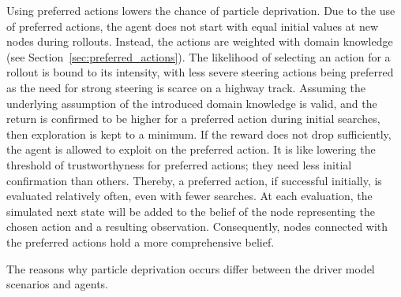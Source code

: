 


Using preferred actions lowers the chance of particle deprivation. Due to the use of preferred actions, the agent does not start with equal initial values at new nodes during rollouts. Instead, the actions are weighted with domain knowledge (see Section~\ref{sec:preferred_actions}). The likelihood of selecting an action for a rollout is bound to its intensity, with less severe steering actions being preferred as the need for strong steering is scarce on a highway track. Assuming the underlying assumption of the introduced domain knowledge is valid, and the return is confirmed to be higher for a preferred action during initial searches, then exploration is kept to a minimum. If the reward does not drop sufficiently, the agent is allowed to exploit on the preferred action. It is like lowering the threshold of trustworthyness for preferred actions; they need less initial confirmation than others. Thereby, a preferred  action, if successful initially, is evaluated relatively often, even with fewer searches. At each evaluation, the simulated next state will be added to the belief of the node representing the chosen action and a resulting observation. Consequently, nodes connected with the preferred actions hold a more comprehensive belief.

The reasons why particle deprivation occurs differ between the driver model scenarios and agents. 




